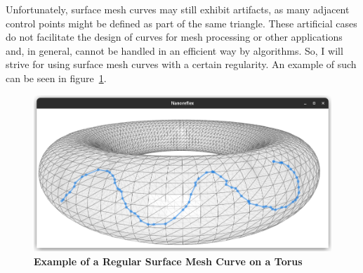 \documentclass{stdlocal}
\begin{document}

  Unfortunately, surface mesh curves may still exhibit artifacts, as many adjacent control points might be defined as part of the same triangle.
  These artificial cases do not facilitate the design of curves for mesh processing or other applications and, in general, cannot be handled in an efficient way by algorithms.
  So, I will strive for using surface mesh curves with a certain regularity.
  An example of such can be seen in figure~\ref{fig:surface-mesh-curve-example}.

  \begin{figure}[t]
    \centering
    \includegraphics[width=0.8\linewidth,trim={15px 20 25 50},clip]{images/surface-mesh-curve-torus.png}
    \caption[Example of a Regular Surface Mesh Curve on a Torus]{%
      \textbf{Example of a Regular Surface Mesh Curve on a Torus}\\
    }
    \label{fig:surface-mesh-curve-example}
  \end{figure}
\end{document}
